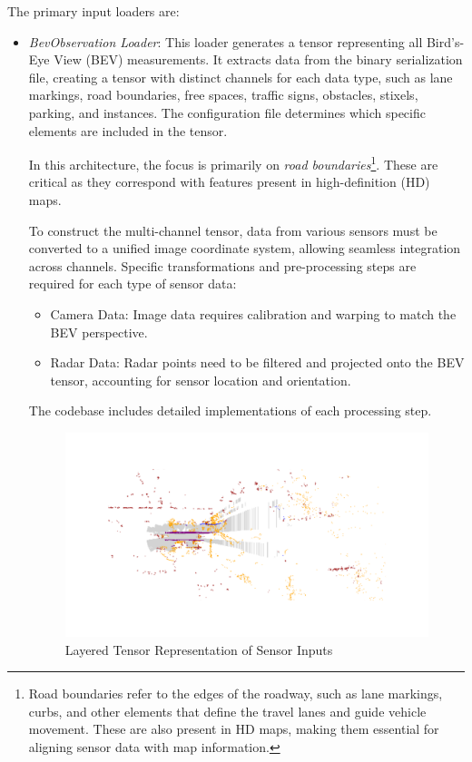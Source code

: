 The primary input loaders are:
\begin{itemize}
    \item \textit{BevObservation Loader}: This loader generates a tensor representing all Bird's-Eye View (BEV) measurements. It extracts data from the binary serialization file, creating a tensor with distinct channels for each data type, such as lane markings, road boundaries, free spaces, traffic signs, obstacles, stixels, parking, and instances. The configuration file determines which specific elements are included in the tensor.

    In this architecture, the focus is primarily on \textit{road boundaries}\footnote{Road boundaries refer to the edges of the roadway, such as lane markings, curbs, and other elements that define the travel lanes and guide vehicle movement. These are also present in HD maps, making them essential for aligning sensor data with map information.}. These are critical as they correspond with features present in high-definition (HD) maps.

    To construct the multi-channel tensor, data from various sensors must be converted to a unified image coordinate system, allowing seamless integration across channels. Specific transformations and pre-processing steps are required for each type of sensor data:
    \begin{itemize}
        \item Camera Data: Image data requires calibration and warping to match the BEV perspective.
        \item Radar Data: Radar points need to be filtered and projected onto the BEV tensor, accounting for sensor location and orientation.
    \end{itemize}
    
    The codebase includes detailed implementations of each processing step. 
    \begin{figure}[H]
        \centering
        \includegraphics[width=0.85\linewidth]{LateX//figs/bevLoader.pdf}
        \caption{Layered Tensor Representation of Sensor Inputs}
        \label{fig:bev-loader}
    \end{figure}


\end{itemize}
